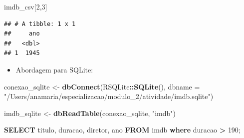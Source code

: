 \documentclass[
]{article}
\newenvironment{Shaded}{\begin{snugshade}}{\end{snugshade}}
\newcommand{\AttributeTok}[1]{\textcolor[rgb]{0.13,0.29,0.53}{#1}}
\newcommand{\DecValTok}[1]{\textcolor[rgb]{0.00,0.00,0.81}{#1}}
\newcommand{\FunctionTok}[1]{\textcolor[rgb]{0.13,0.29,0.53}{\textbf{#1}}}
\newcommand{\KeywordTok}[1]{\textcolor[rgb]{0.13,0.29,0.53}{\textbf{#1}}}
\newcommand{\NormalTok}[1]{#1}
\newcommand{\OperatorTok}[1]{\textcolor[rgb]{0.81,0.36,0.00}{\textbf{#1}}}
\newcommand{\OtherTok}[1]{\textcolor[rgb]{0.56,0.35,0.01}{#1}}
\newcommand{\SpecialCharTok}[1]{\textcolor[rgb]{0.81,0.36,0.00}{\textbf{#1}}}
\newcommand{\StringTok}[1]{\textcolor[rgb]{0.31,0.60,0.02}{#1}}
\providecommand{\tightlist}{%
  \setlength{\itemsep}{0pt}\setlength{\parskip}{0pt}}
\begin{document}
\begin{Shaded}
\begin{Highlighting}[]
\NormalTok{imdb\_csv[}\DecValTok{2}\NormalTok{,}\DecValTok{3}\NormalTok{]}
\end{Highlighting}
\end{Shaded}

\begin{verbatim}
## # A tibble: 1 x 1
##     ano
##   <dbl>
## 1  1945
\end{verbatim}

\begin{itemize}
\tightlist
\item
  Abordagem para SQLite:
\end{itemize}

\begin{Shaded}
\begin{Highlighting}[]
\NormalTok{conexao\_sqlite }\OtherTok{\textless{}{-}} \FunctionTok{dbConnect}\NormalTok{(RSQLite}\SpecialCharTok{::}\FunctionTok{SQLite}\NormalTok{(), }\AttributeTok{dbname =} \StringTok{"/Users/anamaria/especializacao/modulo\_2/atividade/imdb.sqlite"}\NormalTok{)}

\NormalTok{imdb\_sqlite }\OtherTok{\textless{}{-}} \FunctionTok{dbReadTable}\NormalTok{(conexao\_sqlite, }\StringTok{"imdb"}\NormalTok{)}
\end{Highlighting}
\end{Shaded}

\begin{Shaded}
\begin{Highlighting}[]
\KeywordTok{SELECT}\NormalTok{ titulo, duracao, diretor, ano }\KeywordTok{FROM}\NormalTok{ imdb }\KeywordTok{where}\NormalTok{ duracao }\OperatorTok{\textgreater{}} \DecValTok{190}\NormalTok{;}
\end{Highlighting}
\end{Shaded}
\end{document}
